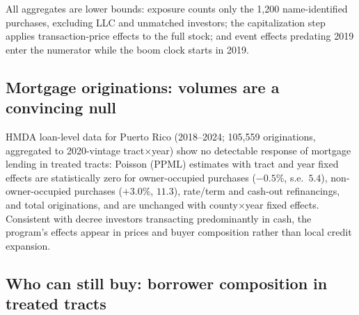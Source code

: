 \documentclass[11pt]{article}
\begin{document}
All aggregates are lower bounds: exposure counts only the 1{,}200
name-identified purchases, excluding LLC and unmatched investors; the
capitalization step applies transaction-price effects to the full stock; and
event effects predating 2019 enter the numerator while the boom clock starts
in 2019.

\subsection{Mortgage originations: volumes are a convincing null}

HMDA loan-level data for Puerto Rico (2018--2024; 105{,}559 originations,
aggregated to 2020-vintage tract$\times$year) show no detectable response of
mortgage lending in treated tracts: Poisson (PPML) estimates with tract and
year fixed effects are statistically zero for owner-occupied purchases
($-0.5$\%, s.e.\ $5.4$), non-owner-occupied purchases ($+3.0$\%, $11.3$),
rate/term and cash-out refinancings, and total originations, and are
unchanged with county$\times$year fixed effects. Consistent with decree
investors transacting predominantly in cash, the program's effects appear in
prices and buyer composition rather than local credit expansion.

\subsection{Who can still buy: borrower composition in treated tracts}
\end{document}
